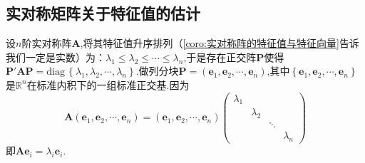 \subsection{实对称矩阵关于特征值的估计}
设$n$阶实对称阵$\bm{A}$,将其特征值升序排列（\cref{coro:实对称阵的特征值与特征向量}告诉我们一定是实数）为：$\lambda_1\leqslant\lambda_2\leqslant\cdots\leqslant\lambda_n$,于是存在正交阵$\bm{P}$使得$\bm{P}'\bm{AP}=\mathrm{diag}\,\left\{
    \lambda_1,\lambda_2,\cdots,\lambda_n
    \right\}$.做列分块$\bm{P}=\left(
        \bm{e}_1,\bm{e}_2,\cdots,\bm{e}_n
    \right)$,其中$\left\{
        \bm{e}_1,\bm{e}_2,\cdots,\bm{e}_n
    \right\}$是$\mathbb{R}^n$在标准内积下的一组标准正交基.因为\[
    \bm{A}\left(
        \bm{e}_1,\bm{e}_2,\cdots,\bm{e}_n
    \right)=\left(
        \bm{e}_1,\bm{e}_2,\cdots,\bm{e}_n
    \right)\begin{pmatrix}
        \lambda_1&&&\\
        &\lambda_2&&\\
        &&\ddots&\\
        &&&\lambda_n
    \end{pmatrix}
    \]即$\bm{Ae}_i=\lambda_i\bm{e}_i$.

